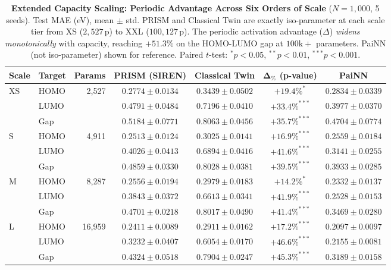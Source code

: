 \begin{table}[t]
\centering
\small
\caption{\textbf{Extended Capacity Scaling: Periodic Advantage Across Six Orders of Scale} ($N = 1{,}000$, 5 seeds). Test MAE (eV), mean $\pm$ std. PRISM and Classical Twin are exactly iso-parameter at each scale tier from XS ($2{,}527$\,p) to XXL ($100{,}127$\,p). The periodic activation advantage ($\Delta$) \textit{widens monotonically} with capacity, reaching $+51.3\%$ on the HOMO-LUMO gap at $100\mathrm{k}+$ parameters. PaiNN (not iso-parameter) shown for reference. Paired $t$-test: $^{*}p < 0.05$, $^{**}p < 0.01$, $^{***}p < 0.001$.}
\label{tab:param_scaling_extended}
\begin{tabular}{llrcccc}
\toprule
\textbf{Scale} & \textbf{Target} & \textbf{Params} & \textbf{PRISM (SIREN)} & \textbf{Classical Twin} & $\boldsymbol{\Delta}_\%$ \textbf{(p-value)} & \textbf{PaiNN} \\
\midrule
XS & HOMO & 2,527 & $0.2774 \pm 0.0134$ & $0.3439 \pm 0.0502$ & $+19.4\%^{*}$ & $0.2834 \pm 0.0339$ \\
 & LUMO &  & $0.4791 \pm 0.0484$ & $0.7196 \pm 0.0410$ & $+33.4\%^{***}$ & $0.3977 \pm 0.0370$ \\
 & Gap &  & $0.5184 \pm 0.0771$ & $0.8063 \pm 0.0456$ & $+35.7\%^{***}$ & $0.4704 \pm 0.0774$ \\
\midrule
S & HOMO & 4,911 & $0.2513 \pm 0.0124$ & $0.3025 \pm 0.0141$ & $+16.9\%^{***}$ & $0.2559 \pm 0.0184$ \\
 & LUMO &  & $0.4026 \pm 0.0413$ & $0.6894 \pm 0.0416$ & $+41.6\%^{***}$ & $0.3141 \pm 0.0255$ \\
 & Gap &  & $0.4859 \pm 0.0330$ & $0.8028 \pm 0.0381$ & $+39.5\%^{***}$ & $0.3933 \pm 0.0285$ \\
\midrule
M & HOMO & 8,287 & $0.2556 \pm 0.0194$ & $0.2979 \pm 0.0183$ & $+14.2\%^{*}$ & $0.2332 \pm 0.0137$ \\
 & LUMO &  & $0.3843 \pm 0.0372$ & $0.6613 \pm 0.0341$ & $+41.9\%^{***}$ & $0.2528 \pm 0.0153$ \\
 & Gap &  & $0.4701 \pm 0.0218$ & $0.8017 \pm 0.0490$ & $+41.4\%^{***}$ & $0.3469 \pm 0.0280$ \\
\midrule
L & HOMO & 16,959 & $0.2411 \pm 0.0089$ & $0.2911 \pm 0.0162$ & $+17.2\%^{***}$ & $0.2097 \pm 0.0097$ \\
 & LUMO &  & $0.3232 \pm 0.0407$ & $0.6054 \pm 0.0170$ & $+46.6\%^{***}$ & $0.2155 \pm 0.0081$ \\
 & Gap &  & $0.4324 \pm 0.0518$ & $0.7904 \pm 0.0247$ & $+45.3\%^{***}$ & $0.3189 \pm 0.0158$ \\

\end{tabular}
\end{table}
